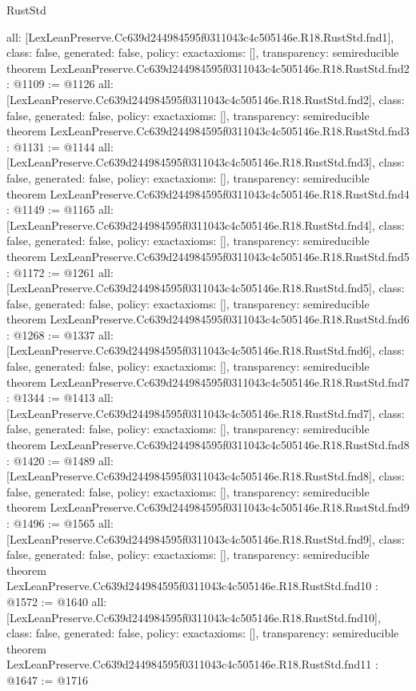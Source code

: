 \begin{lexlean}{RustStd}
\begin{coremodule}
{  all: [LexLeanPreserve.Cc639d244984595f0311043c4c505146e.R18.RustStd.fnd1],
  class: false,
  generated: false,
  policy: exact{axioms: []},
  transparency: semireducible
}
theorem LexLeanPreserve.Cc639d244984595f0311043c4c505146e.R18.RustStd.fnd2 : @1109 := @1126 {
  all: [LexLeanPreserve.Cc639d244984595f0311043c4c505146e.R18.RustStd.fnd2],
  class: false,
  generated: false,
  policy: exact{axioms: []},
  transparency: semireducible
}
theorem LexLeanPreserve.Cc639d244984595f0311043c4c505146e.R18.RustStd.fnd3 : @1131 := @1144 {
  all: [LexLeanPreserve.Cc639d244984595f0311043c4c505146e.R18.RustStd.fnd3],
  class: false,
  generated: false,
  policy: exact{axioms: []},
  transparency: semireducible
}
theorem LexLeanPreserve.Cc639d244984595f0311043c4c505146e.R18.RustStd.fnd4 : @1149 := @1165 {
  all: [LexLeanPreserve.Cc639d244984595f0311043c4c505146e.R18.RustStd.fnd4],
  class: false,
  generated: false,
  policy: exact{axioms: []},
  transparency: semireducible
}
theorem LexLeanPreserve.Cc639d244984595f0311043c4c505146e.R18.RustStd.fnd5 : @1172 := @1261 {
  all: [LexLeanPreserve.Cc639d244984595f0311043c4c505146e.R18.RustStd.fnd5],
  class: false,
  generated: false,
  policy: exact{axioms: []},
  transparency: semireducible
}
theorem LexLeanPreserve.Cc639d244984595f0311043c4c505146e.R18.RustStd.fnd6 : @1268 := @1337 {
  all: [LexLeanPreserve.Cc639d244984595f0311043c4c505146e.R18.RustStd.fnd6],
  class: false,
  generated: false,
  policy: exact{axioms: []},
  transparency: semireducible
}
theorem LexLeanPreserve.Cc639d244984595f0311043c4c505146e.R18.RustStd.fnd7 : @1344 := @1413 {
  all: [LexLeanPreserve.Cc639d244984595f0311043c4c505146e.R18.RustStd.fnd7],
  class: false,
  generated: false,
  policy: exact{axioms: []},
  transparency: semireducible
}
theorem LexLeanPreserve.Cc639d244984595f0311043c4c505146e.R18.RustStd.fnd8 : @1420 := @1489 {
  all: [LexLeanPreserve.Cc639d244984595f0311043c4c505146e.R18.RustStd.fnd8],
  class: false,
  generated: false,
  policy: exact{axioms: []},
  transparency: semireducible
}
theorem LexLeanPreserve.Cc639d244984595f0311043c4c505146e.R18.RustStd.fnd9 : @1496 := @1565 {
  all: [LexLeanPreserve.Cc639d244984595f0311043c4c505146e.R18.RustStd.fnd9],
  class: false,
  generated: false,
  policy: exact{axioms: []},
  transparency: semireducible
}
theorem LexLeanPreserve.Cc639d244984595f0311043c4c505146e.R18.RustStd.fnd10 : @1572 := @1640 {
  all: [LexLeanPreserve.Cc639d244984595f0311043c4c505146e.R18.RustStd.fnd10],
  class: false,
  generated: false,
  policy: exact{axioms: []},
  transparency: semireducible
}
theorem LexLeanPreserve.Cc639d244984595f0311043c4c505146e.R18.RustStd.fnd11 : @1647 := @1716 {
}
\end{coremodule}
\end{lexlean}
